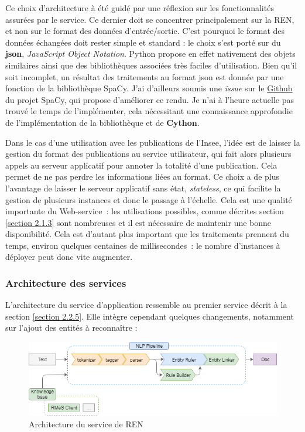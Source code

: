 Ce choix d'architecture à été guidé par une réflexion sur les fonctionnalités assurées par le service. Ce dernier doit se concentrer principalement sur la REN, et non sur le format des données d'entrée/sortie. C'est pourquoi le format des données échangées doit rester simple et standard : le choix s'est porté sur du \textbf{json}, \textit{JavaScript Object Notation}. Python propose en effet nativement des objets similaires ainsi que des bibliothèques associées très faciles d'utilisation. Bien qu'il soit incomplet, un résultat des traitements au format json est donnée par une fonction de la bibliothèque SpaCy. J'ai d'ailleurs soumis une \textit{issue} sur le \href{https://github.com/explosion/spaCy/issues/3987}{Github} \cite{spacy-issue} du projet SpaCy, qui propose d'améliorer ce rendu. Je n'ai à l'heure actuelle pas trouvé le temps de l'implémenter, cela nécessitant une connaissance approfondie de l'implémentation de la bibliothèque et de \textbf{Cython}.

Dans le cas d'une utilisation avec les publications de l'Insee, l'idée est de laisser la gestion du format des publications au service utilisateur, qui fait alors plusieurs appels au serveur applicatif pour annoter la totalité d'une publication. Cela permet de ne pas perdre les informations liées au format. Ce choix a de plus l'avantage de laisser le serveur applicatif sans état, \textit{stateless}, ce qui facilite la gestion de plusieurs instances et donc le passage à l'échelle. Cela est une qualité importante du Web-service~: les utilisations possibles, comme décrites section \ref{section 2.1.3} sont nombreuses et il est nécessaire de maintenir une bonne disponibilité. Cela est d'autant plus important que les traitements prennent du temps, environ quelques centaines de millisecondes~: le nombre d'instances à déployer peut donc vite augmenter. 
\newline
\label{section 3.2.1}

\subsubsection*{Architecture des services}
L'architecture du service d'application ressemble au premier service décrit à la section \ref{section 2.2.5}. Elle intègre cependant quelques changements, notamment sur l'ajout des entités à reconnaître :
\vspace{10pt}
\begin{figure}[H]
    \centering
    \includegraphics[scale=0.7]{images/InspaCy-archi.png}
    \caption{Architecture du service de REN}
    \label{fig:inspacy-archi}
\end{figure}
\vspace{10pt}

